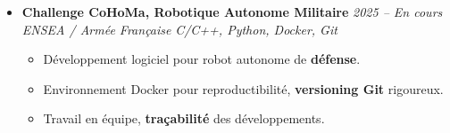 \documentclass[a4paper,11pt]{article}
\begin{document}
\begin{itemize}[leftmargin=*, label={-}]
\item \textbf{Challenge CoHoMa, Robotique Autonome Militaire} \hfill \textit{2025 -- En cours} \\
\textit{ENSEA / Armée Française} \hfill \textit{C/C++, Python, Docker, Git}
\vspace{-2pt}
    \begin{itemize}[leftmargin=0.4cm, nosep, label=\tiny$\bullet$]
        \item \small{Développement logiciel pour robot autonome de \textbf{défense}.}
        \item \small{Environnement Docker pour reproductibilité, \textbf{versioning Git} rigoureux.}
        \item \small{Travail en équipe, \textbf{traçabilité} des développements.}
    \end{itemize}

\end{itemize}

\end{document}
